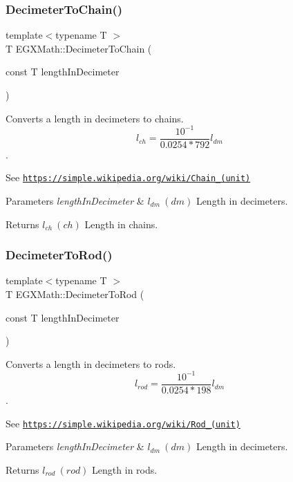 \subsubsection{\texorpdfstring{Decimeter\+To\+Chain()}{DecimeterToChain()}}
{\footnotesize\ttfamily template$<$typename T $>$ \\
T E\+G\+X\+Math\+::\+Decimeter\+To\+Chain (\begin{DoxyParamCaption}\item[{const T}]{length\+In\+Decimeter }\end{DoxyParamCaption})}



Converts a length in decimeters to chains. \[ l_{ch}= \frac{10^{-1}}{0.0254 * 792} l_{dm} \]. 

See \href{https://simple.wikipedia.org/wiki/Chain_(unit)}{\tt https\+://simple.\+wikipedia.\+org/wiki/\+Chain\+\_\+(unit)} 
\begin{DoxyParams}{Parameters}
{\em length\+In\+Decimeter} & $ l_{dm}\ (dm)$ Length in decimeters. \\
\hline
\end{DoxyParams}
\begin{DoxyReturn}{Returns}
$ l_{ch}\ (ch)$ Length in chains. 
\end{DoxyReturn}
\mbox{\label{group___e_g_x_math-_conversions-_length_conversions-_decimeter-_surveyors_gaf34122272f5724db35f8400d284e2ec8}} 
\subsubsection{\texorpdfstring{Decimeter\+To\+Rod()}{DecimeterToRod()}}
{\footnotesize\ttfamily template$<$typename T $>$ \\
T E\+G\+X\+Math\+::\+Decimeter\+To\+Rod (\begin{DoxyParamCaption}\item[{const T}]{length\+In\+Decimeter }\end{DoxyParamCaption})}



Converts a length in decimeters to rods. \[ l_{rod}= \frac{10^{-1}}{0.0254 * 198} l_{dm} \]. 

See \href{https://simple.wikipedia.org/wiki/Rod_(unit)}{\tt https\+://simple.\+wikipedia.\+org/wiki/\+Rod\+\_\+(unit)} 
\begin{DoxyParams}{Parameters}
{\em length\+In\+Decimeter} & $ l_{dm}\ (dm)$ Length in decimeters. \\
\hline
\end{DoxyParams}
\begin{DoxyReturn}{Returns}
$ l_{rod}\ (rod)$ Length in rods. 
\end{DoxyReturn}
